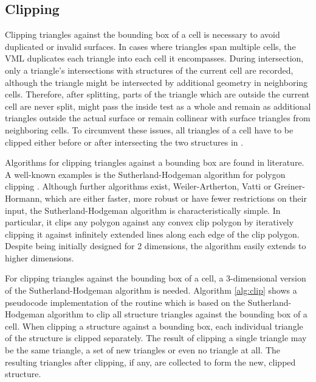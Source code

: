 \subsection{Clipping}
\label{sec:clipping}

Clipping triangles against the bounding box of a cell is necessary to avoid duplicated or invalid surfaces.
In cases where triangles span multiple cells, the VML duplicates each triangle into each cell it encompasses.
During intersection, only a triangle's intersections with structures of the current cell are recorded, although the triangle might be intersected by additional geometry in neighboring cells.
Therefore, after splitting, parts of the triangle which are outside the current cell are never split, might pass the inside test as a whole and remain as additional triangles outside the actual surface or remain collinear with surface triangles from neighboring cells.
To circumvent these issues, all triangles of a cell have to be clipped either before or after intersecting the two structures in .

Algorithms for clipping triangles against a bounding box are found in literature.
A well-known examples is the Sutherland-Hodgeman algorithm for polygon clipping \cite{polygon_clipping}.
Although further algorithms exist, \eg Weiler-Artherton, Vatti or Greiner-Hormann, which are either faster, more robust or have fewer restrictions on their input, the Sutherland-Hodgeman algorithm is characteristically simple.
In particular, it clips any polygon against any convex clip polygon by iteratively clipping it against infinitely extended lines along each edge of the clip polygon.
Despite being initially designed for 2 dimensions, the algorithm easily extends to higher dimensions.

For clipping triangles against the bounding box of a cell, a 3-dimensional version of the Sutherland-Hodgeman algorithm is needed.
Algorithm \ref{alg:clip} shows a pseudocode implementation of the  routine which is based on the Sutherland-Hodgeman algorithm to clip all structure triangles against the bounding box of a cell.
%
When clipping a structure against a bounding box, each individual triangle of the structure is clipped separately.
The result of clipping a single triangle may be the same triangle, a set of new triangles or even no triangle at all.
The resulting triangles after clipping, if any, are collected to form the new, clipped structure.

